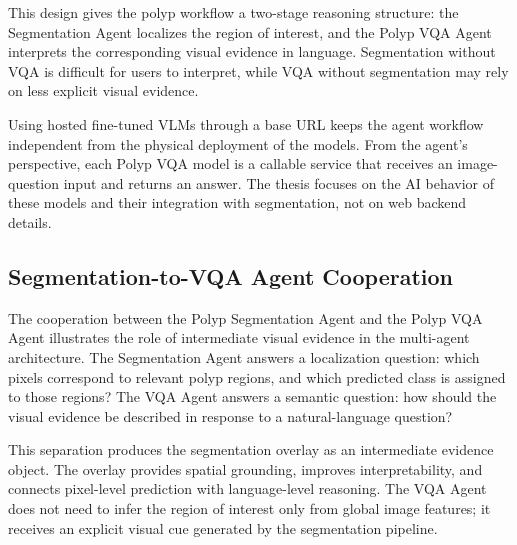 This design gives the polyp workflow a two-stage reasoning structure: the Segmentation Agent localizes the region of interest, and the Polyp VQA Agent interprets the corresponding visual evidence in language. Segmentation without VQA is difficult for users to interpret, while VQA without segmentation may rely on less explicit visual evidence.

Using hosted fine-tuned VLMs through a base URL keeps the agent workflow independent from the physical deployment of the models. From the agent's perspective, each Polyp VQA model is a callable service that receives an image-question input and returns an answer. The thesis focuses on the AI behavior of these models and their integration with segmentation, not on web backend details.

\subsection{Segmentation-to-VQA Agent Cooperation}

The cooperation between the Polyp Segmentation Agent and the Polyp VQA Agent illustrates the role of intermediate visual evidence in the multi-agent architecture. The Segmentation Agent answers a localization question: which pixels correspond to relevant polyp regions, and which predicted class is assigned to those regions? The VQA Agent answers a semantic question: how should the visual evidence be described in response to a natural-language question?

This separation produces the segmentation overlay as an intermediate evidence object. The overlay provides spatial grounding, improves interpretability, and connects pixel-level prediction with language-level reasoning. The VQA Agent does not need to infer the region of interest only from global image features; it receives an explicit visual cue generated by the segmentation pipeline.

